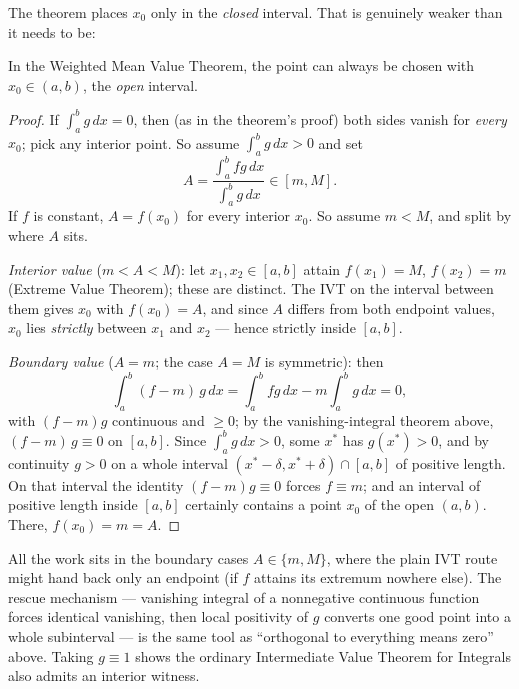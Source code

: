 \documentclass[11pt]{report}
\begin{document}
The theorem places $x_0$ only in the \emph{closed} interval. That is genuinely weaker than it needs to be:

\begin{propbox}
In the Weighted Mean Value Theorem, the point can always be chosen with $x_0 \in (a,b)$, the \emph{open} interval.
\end{propbox}

\begin{proof}
If $\int_a^b g\,dx = 0$, then (as in the theorem's proof) both sides vanish for \emph{every} $x_0$; pick any interior point. So assume $\int_a^b g\,dx > 0$ and set
\[
A = \frac{\int_a^b fg\,dx}{\int_a^b g\,dx} \in [m, M].
\]
If $f$ is constant, $A = f(x_0)$ for every interior $x_0$. So assume $m < M$, and split by where $A$ sits.

\emph{Interior value} ($m < A < M$): let $x_1, x_2 \in [a,b]$ attain $f(x_1) = M$, $f(x_2) = m$ (Extreme Value Theorem); these are distinct. The IVT on the interval between them gives $x_0$ with $f(x_0) = A$, and since $A$ differs from both endpoint values, $x_0$ lies \emph{strictly} between $x_1$ and $x_2$ --- hence strictly inside $[a,b]$.

\emph{Boundary value} ($A = m$; the case $A = M$ is symmetric): then
\[
\int_a^b (f - m)\,g\,dx = \int_a^b fg\,dx - m \int_a^b g\,dx = 0,
\]
with $(f-m)g$ continuous and $\geq 0$; by the vanishing-integral theorem above, $(f - m)\,g \equiv 0$ on $[a,b]$. Since $\int_a^b g\,dx > 0$, some $x^*$ has $g(x^*) > 0$, and by continuity $g > 0$ on a whole interval $(x^* - \delta, x^* + \delta) \cap [a,b]$ of positive length. On that interval the identity $(f-m)g \equiv 0$ forces $f \equiv m$; and an interval of positive length inside $[a,b]$ certainly contains a point $x_0$ of the open $(a,b)$. There, $f(x_0) = m = A$.
\end{proof}

\begin{rembox}
All the work sits in the boundary cases $A \in \{m, M\}$, where the plain IVT route might hand back only an endpoint (if $f$ attains its extremum nowhere else). The rescue mechanism --- vanishing integral of a nonnegative continuous function forces identical vanishing, then local positivity of $g$ converts one good point into a whole subinterval --- is the same tool as ``orthogonal to everything means zero'' above. Taking $g \equiv 1$ shows the ordinary Intermediate Value Theorem for Integrals also admits an interior witness.
\end{rembox}
\end{document}
